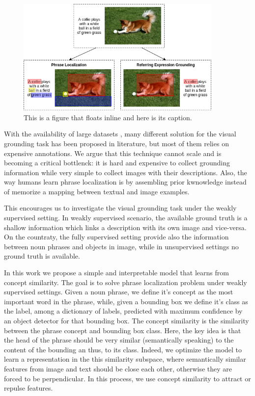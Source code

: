\begin{figure}
    \centering
    \includegraphics[width=0.9\textwidth]{figures/dog-playing-with-ball.png}
    \caption[Short figure name.]{This is a figure that floats inline and here is its caption. 
    \label{fig:dog-playing-with-ball}}
\end{figure}

With the availability of large datasets ,
many different solution for the visual grounding task has been
proposed in literature, but most of them relies on expensive
annotations. We argue that this technique cannot scale and is becoming
a critical bottlenck: it is hard and expensive to collect grounding
information while very simple to collect images with their
descriptions. Also, the way humans learn phrase localization is by
assembling prior kwnowledge instead of memorize a mapping between
textual and image examples.

This encourages us to investigate the visual grounding task under the
weakly supervised setting. In weakly supervised scenario, the
available ground truth is a shallow information which links a
description with its own image and vice-versa. On the countraty, the
fully supervised setting provide also the information between noun
phrases and objects in image, while in unsupervised settings no ground
truth is available.

In this work we propose a simple and interpretable model that learns
from concept similarity. The goal is to solve phrase localization
problem under weakly supervised settings. Given a noun phrase, we
define it's concept as the most important word in the phrase, while,
given a bounding box we define it's class as the label, among a
dictionary of labels, predicted with maximum confidence by an object
detector for that bounding box. The concept similarity is the
similarity between the phrase concept and bounding box class. Here,
the key idea is that the head of the phrase should be very similar
(semantically speaking) to the content of the bounding an thus, to its
class. Indeed, we optimize the model to learn a representation in the
this similarity subspace, where semantically similar features from
image and text should be close each other, otherwise they are forced
to be perpendicular. In this process, we use concept similarity to
attract or repulse features.

